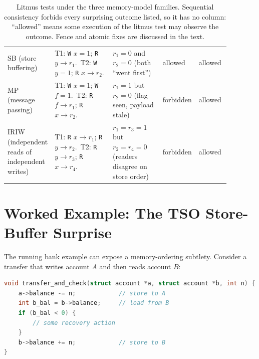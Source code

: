 \begin{table}[htbp]
\centering
\caption{Litmus tests under the three memory-model families. Sequential
consistency forbids every surprising outcome listed, so it has no column:
``allowed'' means some execution of the litmus test may observe the
outcome. Fence and atomic fixes are discussed in the text.}
\label{tab:litmus-models}
\renewcommand{\arraystretch}{1.3}
\setlength{\tabcolsep}{4pt}
\begin{tabular}{M{0.11\linewidth} M{0.28\linewidth} M{0.23\linewidth} M{0.12\linewidth} M{0.14\linewidth}}
\hline
{} &
 &
 &
 &
 \\
\hline
SB (store buffering) &
T1: \texttt{W} $x{=}1$; \texttt{R} $y \to r_1$.\ T2: \texttt{W} $y{=}1$; \texttt{R} $x \to r_2$. &
$r_1{=}0$ and $r_2{=}0$ (both ``went first'') &
allowed &
allowed \\
MP (message passing) &
T1: \texttt{W} $x{=}1$; \texttt{W} $f{=}1$.\ T2: \texttt{R} $f \to r_1$; \texttt{R} $x \to r_2$. &
$r_1{=}1$ but $r_2{=}0$ (flag seen, payload stale) &
forbidden &
allowed \\
IRIW (independent reads of independent writes) &
T1: \texttt{R} $x \to r_1$; \texttt{R} $y \to r_2$.\ T2: \texttt{R} $y \to r_3$; \texttt{R} $x \to r_4$. &
$r_1{=}r_3{=}1$ but $r_2{=}r_4{=}0$ (readers disagree on store order) &
forbidden &
allowed \\
\hline
\end{tabular}
\end{table}

\section{Worked Example: The TSO Store-Buffer Surprise}
\label{sec:tso-example}

The running bank example can expose a memory-ordering subtlety. Consider a
transfer that writes account $A$ and then reads account $B$:

\begin{lstlisting}[language=C, caption={A transfer that writes then reads.},
label={lst:tso-transfer-check}]
void transfer_and_check(struct account *a, struct account *b, int n) {
    a->balance -= n;            // store to A
    int b_bal = b->balance;     // load from B
    if (b_bal < 0) {
        // some recovery action
    }
    b->balance += n;            // store to B
}
\end{lstlisting}

